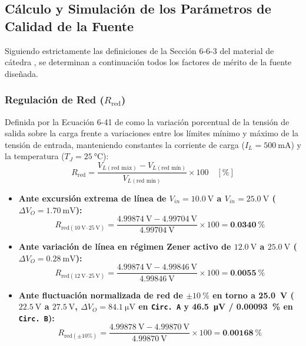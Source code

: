 \subsection{Cálculo y Simulación de los Parámetros de Calidad de la Fuente}
Siguiendo estrictamente las definiciones de la Sección 6-6-3 del material de cátedra \cite{gonzalez_p2}, se determinan a continuación todos los factores de mérito de la fuente diseñada.

\subsubsection{Regulación de Red ($R_{\text{red}}$)}
Definida por la Ecuación 6-41 de \cite{gonzalez_p2} como la variación porcentual de la tensión de salida sobre la carga frente a variaciones entre los límites mínimo y máximo de la tensión de entrada, manteniendo constantes la corriente de carga ($I_L = \SI{500}{\milli\ampere}$) y la temperatura ($T_J = \SI{25}{\celsius}$):
\begin{equation}
    R_{\text{red}} = \frac{V_{L(\text{red máx})} - V_{L(\text{red mín})}}{V_{L(\text{red mín})}} \times 100 \quad [\%]
    \label{eq:rred_def}
\end{equation}
\begin{itemize}
    \item \textbf{Ante excursión extrema de línea de $V_{in} = \SI{10,0}{\volt}$ a $V_{in} = \SI{25,0}{\volt}$ ($\Delta V_O = \SI{1,70}{\milli\volt}$):}
    \begin{equation}
        R_{\text{red}(\SI{10}{\volt}\text{--}\SI{25}{\volt})} = \frac{\SI{4,99874}{\volt} - \SI{4,99704}{\volt}}{\SI{4,99704}{\volt}} \times 100 = \mathbf{\SI{0,0340}{\percent}}
    \end{equation}
    \item \textbf{Ante variación de línea en régimen Zener activo de $\SI{12,0}{\volt}$ a $\SI{25,0}{\volt}$ ($\Delta V_O = \SI{0,28}{\milli\volt}$):}
    \begin{equation}
        R_{\text{red}(\SI{12}{\volt}\text{--}\SI{25}{\volt})} = \frac{\SI{4,99874}{\volt} - \SI{4,99846}{\volt}}{\SI{4,99846}{\volt}} \times 100 = \mathbf{\SI{0,0055}{\percent}}
    \end{equation}
    \item \textbf{Ante fluctuación normalizada de red de $\pm \SI{10}{\percent}$ en torno a \SI{25,0}{\volt} ($\SI{22,5}{\volt}$ a $\SI{27,5}{\volt}$, $\Delta V_O = \SI{84,1}{\micro\volt}$ en \texttt{Circ. A} y \SI{46,5}{\micro\volt} / \SI{0,00093}{\percent} en \texttt{Circ. B}):}
    \begin{equation}
        R_{\text{red}(\pm 10\%)} = \frac{\SI{4,99878}{\volt} - \SI{4,99870}{\volt}}{\SI{4,99870}{\volt}} \times 100 = \mathbf{\SI{0,00168}{\percent}}
    \end{equation}
\end{itemize}

